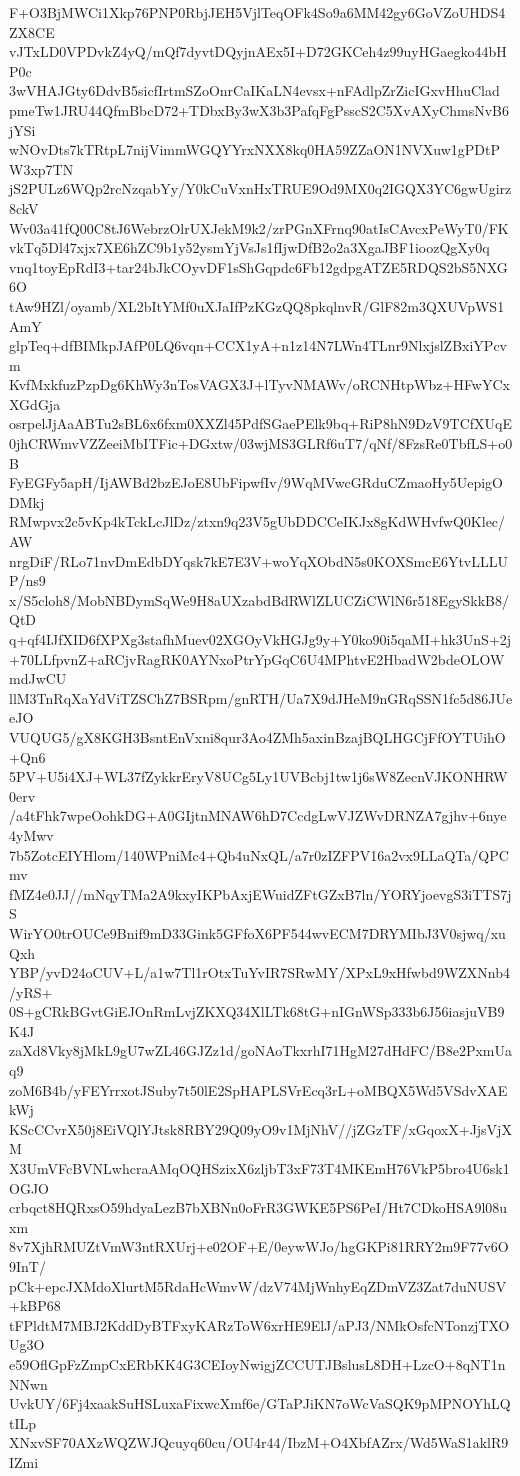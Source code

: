 F+O3BjMWCi1Xkp76PNP0RbjJEH5VjlTeqOFk4So9a6MM42gy6GoVZoUHDS4ZX8CE
vJTxLD0VPDvkZ4yQ/mQf7dyvtDQyjnAEx5I+D72GKCeh4z99uyHGaegko44bHP0c
3wVHAJGty6DdvB5sicfIrtmSZoOnrCaIKaLN4evsx+nFAdlpZrZicIGxvHhuClad
pmeTw1JRU44QfmBbcD72+TDbxBy3wX3b3PafqFgPsscS2C5XvAXyChmsNvB6jYSi
wNOvDts7kTRtpL7nijVimmWGQYYrxNXX8kq0HA59ZZaON1NVXuw1gPDtPW3xp7TN
jS2PULz6WQp2rcNzqabYy/Y0kCuVxnHxTRUE9Od9MX0q2IGQX3YC6gwUgirz8ckV
Wv03a41fQ00C8tJ6WebrzOlrUXJekM9k2/zrPGnXFrnq90atIsCAvcxPeWyT0/FK
vkTq5Dl47xjx7XE6hZC9b1y52ysmYjVsJs1fIjwDfB2o2a3XgaJBF1ioozQgXy0q
vnq1toyEpRdI3+tar24bJkCOyvDF1sShGqpdc6Fb12gdpgATZE5RDQS2bS5NXG6O
tAw9HZl/oyamb/XL2bItYMf0uXJaIfPzKGzQQ8pkqlnvR/GlF82m3QXUVpWS1AmY
glpTeq+dfBIMkpJAfP0LQ6vqn+CCX1yA+n1z14N7LWn4TLnr9NlxjslZBxiYPcvm
KvfMxkfuzPzpDg6KhWy3nTosVAGX3J+lTyvNMAWv/oRCNHtpWbz+HFwYCxXGdGja
osrpelJjAaABTu2sBL6x6fxm0XXZl45PdfSGaePElk9bq+RiP8hN9DzV9TCfXUqE
0jhCRWmvVZZeeiMbITFic+DGxtw/03wjMS3GLRf6uT7/qNf/8FzsRe0TbfLS+o0B
FyEGFy5apH/IjAWBd2bzEJoE8UbFipwfIv/9WqMVwcGRduCZmaoHy5UepigODMkj
RMwpvx2c5vKp4kTckLcJlDz/ztxn9q23V5gUbDDCCeIKJx8gKdWHvfwQ0Klec/AW
nrgDiF/RLo71nvDmEdbDYqsk7kE7E3V+woYqXObdN5s0KOXSmcE6YtvLLLUP/ns9
x/S5cloh8/MobNBDymSqWe9H8aUXzabdBdRWlZLUCZiCWlN6r518EgySkkB8/QtD
q+qf4IJfXID6fXPXg3stafhMuev02XGOyVkHGJg9y+Y0ko90i5qaMI+hk3UnS+2j
+70LLfpvnZ+aRCjvRagRK0AYNxoPtrYpGqC6U4MPhtvE2HbadW2bdeOLOWmdJwCU
llM3TnRqXaYdViTZSChZ7BSRpm/gnRTH/Ua7X9dJHeM9nGRqSSN1fc5d86JUeeJO
VUQUG5/gX8KGH3BsntEnVxni8qur3Ao4ZMh5axinBzajBQLHGCjFfOYTUihO+Qn6
5PV+U5i4XJ+WL37fZykkrEryV8UCg5Ly1UVBcbj1tw1j6sW8ZecnVJKONHRW0erv
/a4tFhk7wpeOohkDG+A0GIjtnMNAW6hD7CcdgLwVJZWvDRNZA7gjhv+6nye4yMwv
7b5ZotcEIYHlom/140WPniMc4+Qb4uNxQL/a7r0zIZFPV16a2vx9LLaQTa/QPCmv
fMZ4e0JJ//mNqyTMa2A9kxyIKPbAxjEWuidZFtGZxB7ln/YORYjoevgS3iTTS7jS
WirYO0trOUCe9Bnif9mD33Gink5GFfoX6PF544wvECM7DRYMIbJ3V0sjwq/xuQxh
YBP/yvD24oCUV+L/a1w7Tl1rOtxTuYvIR7SRwMY/XPxL9xHfwbd9WZXNnb4/yRS+
0S+gCRkBGvtGiEJOnRmLvjZKXQ34XlLTk68tG+nIGnWSp333b6J56iasjuVB9K4J
zaXd8Vky8jMkL9gU7wZL46GJZz1d/goNAoTkxrhI71HgM27dHdFC/B8e2PxmUaq9
zoM6B4b/yFEYrrxotJSuby7t50lE2SpHAPLSVrEcq3rL+oMBQX5Wd5VSdvXAEkWj
KScCCvrX50j8EiVQlYJtsk8RBY29Q09yO9v1MjNhV//jZGzTF/xGqoxX+JjsVjXM
X3UmVFcBVNLwhcraAMqOQHSzixX6zljbT3xF73T4MKEmH76VkP5bro4U6sk1OGJO
crbqct8HQRxsO59hdyaLezB7bXBNn0oFrR3GWKE5PS6PeI/Ht7CDkoHSA9l08uxm
8v7XjhRMUZtVmW3ntRXUrj+e02OF+E/0eywWJo/hgGKPi81RRY2m9F77v6O9InT/
pCk+epcJXMdoXlurtM5RdaHcWmvW/dzV74MjWnhyEqZDmVZ3Zat7duNUSV+kBP68
tFPldtM7MBJ2KddDyBTFxyKARzToW6xrHE9ElJ/aPJ3/NMkOsfcNTonzjTXOUg3O
e59OflGpFzZmpCxERbKK4G3CEIoyNwigjZCCUTJBslusL8DH+LzcO+8qNT1nNNwn
UvkUY/6Fj4xaakSuHSLuxaFixwcXmf6e/GTaPJiKN7oWcVaSQK9pMPNOYhLQtILp
XNxvSF70AXzWQZWJQcuyq60cu/OU4r44/IbzM+O4XbfAZrx/Wd5WaS1aklR9IZmi
